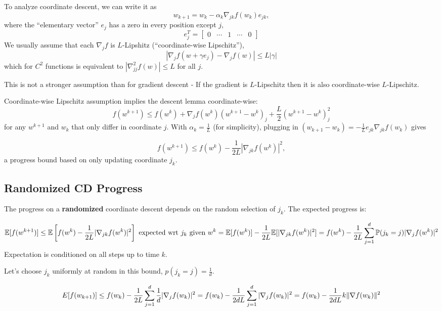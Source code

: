 \documentclass[
]{article}
\begin{document}
To analyze coordinate descent, we can write it as
\[
w_{k+1} = w_k - \alpha_k \nabla_{jk} f(w_k) e_{jk},
\]
where the ``elementary vector'' \(e_j\) has a zero in every position except \(j\),
\[
e_j^T =
\begin{bmatrix}
0 & \cdots & 1 & \cdots & 0
\end{bmatrix}
\]
We usually assume that each \(\nabla_j f\) is \(L\)-Lipshitz (``coordinate-wise Lipschitz''),
\[
|\nabla_j f(w + \gamma e_j) - \nabla_j f(w)| \leq L|\gamma|
\]
which for \(C^2\) functions is equivalent to \(|\nabla_{jj}^2 f(w)| \leq L\) for all \(j\).

This is not a stronger assumption than for gradient descent - If the gradient is \(L\)-Lipschitz then it is also coordinate-wise \(L\)-Lipschitz.

Coordinate-wise Lipschitz assumption implies the descent lemma coordinate-wise:
\[
f(w^{k+1}) \leq f(w^k) + \nabla_j f(w^k)(w^{k+1} - w^k)_j + \frac{L}{2}(w^{k+1} - w^k)^2_j
\]
for any \(w^{k+1}\) and \(w_k\) that only differ in coordinate \(j\). With \(\alpha_k = \frac{1}{L}\) (for simplicity), plugging in \((w_{k+1} - w_k) = -\frac{1}{L}e_{jk}\nabla_{jk} f(w_k)\) gives

\[
f(w^{k+1}) \leq f(w^k) - \frac{1}{2L}|\nabla_{jk} f(w^k)|^2,
\]
a progress bound based on only updating coordinate \(j_k\).

\subsection{Randomized CD Progress}\label{randomized-cd-progress}

The progress on a \textbf{randomized} coordinate descent depends on the random selection of \(j_k\). The expected progress is:

\[
\mathbb{E}[f(w^{k+1})] \leq \mathbb{E}\left[ f(w^k) - \frac{1}{2L}|\nabla_{jk} f(w^k)|^2 \right] \text{ expected wrt } j_k \text{ given }w^k\\ 
= \mathbb{E}[f(w^k)] - \frac{1}{2L}\mathbb{E}[|\nabla_{jk} f(w^k)|^2]\\
= f(w^k) - \frac{1}{2L} \sum_{j=1}^{d} \mathbb{P}(j_k = j)|\nabla_j f(w^k)|^2\\
\]
Expectation is conditioned on all steps up to time \(k\).

Let's choose \(j_k\) uniformly at random in this bound, \(p(j_k = j) = \frac{1}{d}\).

\[
E[f(w_{k+1})] \leq f(w_k) - \frac{1}{2L} \sum_{j=1}^{d} \frac{1}{d} |\nabla_j f(w_k)|^2\\
= f(w_k) - \frac{1}{2dL} \sum_{j=1}^{d} |\nabla_j f(w_k)|^2\\
= f(w_k) - \frac{1}{2dL}k\|\nabla f(w_k)\|^2
\]
\end{document}
